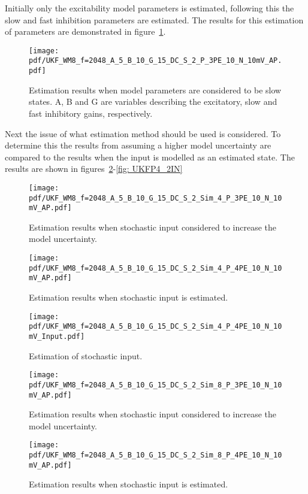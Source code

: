Initially only the excitability model parameters is estimated, following this the slow and fast inhibition parameters are estimated. The results for this estimation of parameters are demonstrated in figure~\ref{fig: AllParameters}.


\begin{figure}
	\centering
		\texttt{[image: pdf/UKF\_WM8\_f=2048\_A\_5\_B\_10\_G\_15\_DC\_S\_2\_P\_3PE\_10\_N\_10mV\_AP.pdf]}
		\caption{Estimation results when model parameters are considered to be slow states. A, B and G are variables describing the excitatory, slow and fast inhibitory gains, respectively.}
	\label{fig: AllParameters}
\end{figure}

Next the issue of what estimation method should be used is considered. To determine this the results from assuming a higher model uncertainty are compared to the results when the input is modelled as an estimated state. The results are shown in figures~\ref{fig: UKFP3_1}-\ref{fig: UKFP4_2IN}

\begin{figure}
	\centering
		\texttt{[image: pdf/UKF\_WM8\_f=2048\_A\_5\_B\_10\_G\_15\_DC\_S\_2\_Sim\_4\_P\_3PE\_10\_N\_10mV\_AP.pdf]}
		\caption{Estimation results when stochastic input considered to increase the model uncertainty.} 
	\label{fig: UKFP3_1}
\end{figure}

\begin{figure}
	\centering
		\texttt{[image: pdf/UKF\_WM8\_f=2048\_A\_5\_B\_10\_G\_15\_DC\_S\_2\_Sim\_4\_P\_4PE\_10\_N\_10mV\_AP.pdf]}
		\caption{Estimation results when stochastic input is estimated.}
	\label{fig: UKFP4_1}
\end{figure}

\begin{figure}
	\centering
		\texttt{[image: pdf/UKF\_WM8\_f=2048\_A\_5\_B\_10\_G\_15\_DC\_S\_2\_Sim\_4\_P\_4PE\_10\_N\_10mV\_Input.pdf]}
		\caption{Estimation of stochastic input.}
	\label{fig: UKFP4_1IN}
\end{figure}

\begin{figure}
	\centering
		\texttt{[image: pdf/UKF\_WM8\_f=2048\_A\_5\_B\_10\_G\_15\_DC\_S\_2\_Sim\_8\_P\_3PE\_10\_N\_10mV\_AP.pdf]}
		\caption{Estimation results when stochastic input considered to increase the model uncertainty.} 
	\label{fig: UKFP3_2}
\end{figure}

\begin{figure}
	\centering
		\texttt{[image: pdf/UKF\_WM8\_f=2048\_A\_5\_B\_10\_G\_15\_DC\_S\_2\_Sim\_8\_P\_4PE\_10\_N\_10mV\_AP.pdf]}
				\caption{Estimation results when stochastic input is estimated.}
	\label{fig: UKFP4_2}
\end{figure}


